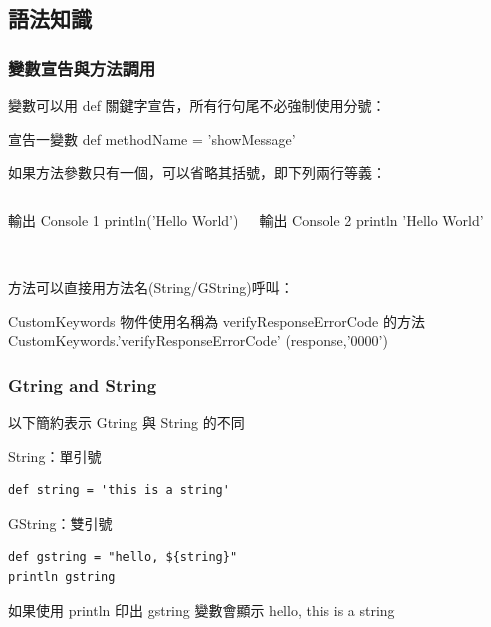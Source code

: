 \documentclass{beamer}
\begin{document}
\subsection{語法知識}
\begin{frame}[fragile]
  \frametitle{變數宣告與方法調用}
  變數可以用 def 關鍵字宣告，所有行句尾不必強制使用分號：
  \begin{block}{宣告一變數}
    def methodName = 'showMessage'
  \end{block}
  如果方法參數只有一個，可以省略其括號，即下列兩行等義：
  \begin{columns}
    \begin{block}{輸出 Console 1}
      println('Hello World')
    \end{block}
    \begin{block}{輸出 Console 2}
      println 'Hello World'
    \end{block}
  \end{columns}
  ~\\
  方法可以直接用方法名(String/GString)呼叫：
  \begin{block}{CustomKeywords 物件使用名稱為 verifyResponseErrorCode 的方法}
    CustomKeywords.'verifyResponseErrorCode' (response,'0000')
  \end{block}
\end{frame}
\begin{frame}[fragile] %
    \frametitle{Gtring and String}
    以下簡約表示 Gtring 與 String 的不同
    \begin{block}{String：單引號}
\begin{lstlisting}
def string = 'this is a string'
\end{lstlisting}
    \end{block}

    \begin{block}{GString：雙引號}
\begin{lstlisting}
def gstring = "hello, ${string}"
println gstring
\end{lstlisting}
    \end{block}
    
    如果使用 println 印出 gstring 變數會顯示 hello, this is a string
\end{frame}
\end{document}
